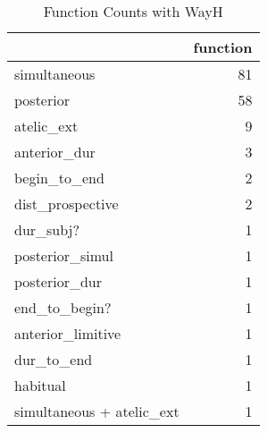 \begin{table}[htbp!]
\centering
\caption{Function Counts with WayH}
\label{table:WayH_fun_ct}
\begin{tabular}{lr}
\toprule
{} &  function \\
\midrule
simultaneous              &        81 \\
posterior                 &        58 \\
atelic\_ext                &         9 \\
anterior\_dur              &         3 \\
begin\_to\_end              &         2 \\
dist\_prospective          &         2 \\
dur\_subj?                 &         1 \\
posterior\_simul           &         1 \\
posterior\_dur             &         1 \\
end\_to\_begin?             &         1 \\
anterior\_limitive         &         1 \\
dur\_to\_end                &         1 \\
habitual                  &         1 \\
simultaneous + atelic\_ext &         1 \\
\bottomrule
\end{tabular}
\end{table}
